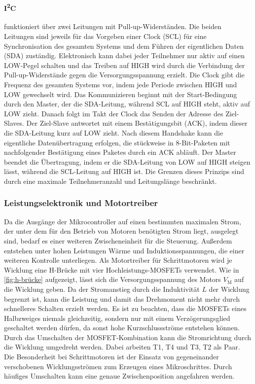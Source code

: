 \paragraph{I\textsuperscript{2}C}
funktioniert über zwei Leitungen mit Pull-up-Widerständen. Die beiden Leitungen sind jeweils für das Vorgeben einer Clock (SCL)
für eine Synchronisation des gesamten Systems und dem Führen der eigentlichen Daten (SDA) zuständig. Elektronisch kann dabei jeder Teilnehmer
nur aktiv auf einen LOW-Pegel schalten und das Treiben auf HIGH wird durch die Verbindung der Pull-up-Widerstände gegen die Versorgungsspannung
erzielt. Die Clock gibt die Frequenz des gesamten Systems vor, indem jede Periode zwischen HIGH und LOW gewechselt wird.
Das Kommunizieren beginnt mit der Start-Bedingung durch den Master, der die SDA-Leitung, während SCL auf HIGH steht, aktiv auf LOW zieht.
Danach folgt im Takt der Clock das Senden der Adresse des Ziel-Slaves. Der Ziel-Slave antwortet mit einem Bestätigungsbit (ACK),
indem dieser die SDA-Leitung kurz auf LOW zieht. Nach diesem Handshake kann die eigentliche Datenübertragung erfolgen, die stückweise in
8-Bit-Paketen mit nachfolgender Bestätigung eines Paketes durch ein ACK abläuft. Der Master beendet die Übertragung, indem er
die SDA-Leitung von LOW auf HIGH steigen lässt, während die SCL-Leitung auf HIGH ist. Die Grenzen dieses Prinzips sind durch eine
maximale Teilnehmeranzahl und Leitungslänge beschränkt.

\subsubsection{Leistungselektronik und Motortreiber}
Da die Ausgänge der Mikrocontroller auf einen bestimmten maximalen Strom, der unter dem für den Betrieb von Motoren benötigten Strom liegt,
ausgelegt sind, bedarf es einer weiteren Zwischeneinheit für die Steuerung. Außerdem entstehen unter hohen Leistungen Wärme und Induktionsspannungen,
die einer weiteren Kontrolle unterliegen. Als Motortreiber für Schrittmotoren wird je Wicklung eine H-Brücke
mit vier Hochleistungs-MOSFETs verwendet. Wie in \cref{fig:h-brücke} aufgezeigt, lässt sich die Versorgungsspannung des Motors $V_\mathrm{M}$ auf
die Wicklung geben. Da der Stromanstieg durch die Induktivität $L$ der Wicklung begrenzt ist, kann die Leistung und damit das Drehmoment
nicht mehr durch schnelleres Schalten erzielt werden. Es ist zu beachten, dass die MOSFETs eines Halbzweiges niemals gleichzeitig,
sondern nur mit einem Verzögerungsglied geschaltet werden dürfen, da sonst hohe Kurzschlussströme entstehen können. Durch das Umschalten
der MOSFET-Kombination kann die Stromrichtung durch die Wicklung umgedreht werden. Dabei arbeiten T1, T4 und T3, T2 als Paar.
Die Besonderheit bei Schrittmotoren ist der Einsatz von gegeneinander verschobenen Wicklungsströmen zum Erzeugen eines Mikroschrittes.
Durch häufiges Umschalten kann eine genaue Zwischenposition angefahren werden.

